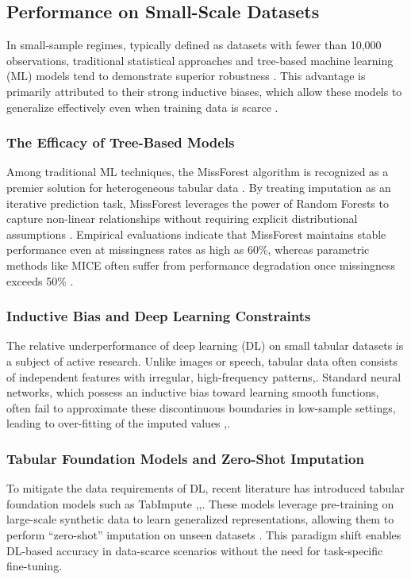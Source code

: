 \documentclass[twocolumn, 9pt]{extarticle}
\begin{document}
\subsection{Performance on Small-Scale Datasets}
In small-sample regimes, typically defined as datasets with fewer than 10,000 observations, traditional statistical approaches and tree-based machine learning (ML) models tend to demonstrate superior robustness \cite{Grinsztajn2022}. This advantage is primarily attributed to their strong inductive biases, which allow these models to generalize effectively even when training data is scarce \cite{beyazit2023}.

\subsubsection{The Efficacy of Tree-Based Models}
Among traditional ML techniques, the MissForest algorithm is recognized as a premier solution for heterogeneous tabular data \cite{Stekhoven2012}. By treating imputation as an iterative prediction task, MissForest leverages the power of Random Forests to capture non-linear relationships without requiring explicit distributional assumptions \cite{Stekhoven2012}. Empirical evaluations indicate that MissForest maintains stable performance even at missingness rates as high as 60\%, whereas parametric methods like MICE often suffer from performance degradation once missingness exceeds 50\% \cite{Azur2011}.

\subsubsection{Inductive Bias and Deep Learning Constraints}
The relative underperformance of deep learning (DL) on small tabular datasets is a subject of active research. Unlike images or speech, tabular data often consists of independent features with irregular, high-frequency patterns\cite{Grinsztajn2022},\cite{beyazit2023}. Standard neural networks, which possess an inductive bias toward learning smooth functions, often fail to approximate these discontinuous boundaries in low-sample settings, leading to over-fitting of the imputed values \cite{Grinsztajn2022},\cite{beyazit2023}.

\subsubsection{Tabular Foundation Models and Zero-Shot Imputation}
To mitigate the data requirements of DL, recent literature has introduced tabular foundation models such as TabImpute \cite{Kossen2025},\cite{Hollmann2023},. These models leverage pre-training on large-scale synthetic data to learn generalized representations, allowing them to perform ``zero-shot'' imputation on unseen datasets \cite{Kossen2025}. This paradigm shift enables DL-based accuracy in data-scarce scenarios without the need for task-specific fine-tuning.
\end{document}
